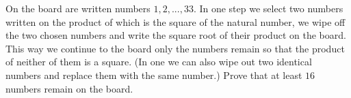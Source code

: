 On the board are written numbers $1, 2,. . . , 33$. In one step we select two numbers written on the product of which is the square of the natural number, we wipe off the two chosen numbers and write the square root of their product on the board. This way we continue to the board only the numbers remain so that the product of neither of them is a square. (In one we can also wipe out two identical numbers and replace them with the same number.) Prove that at least $16$ numbers remain on the board.